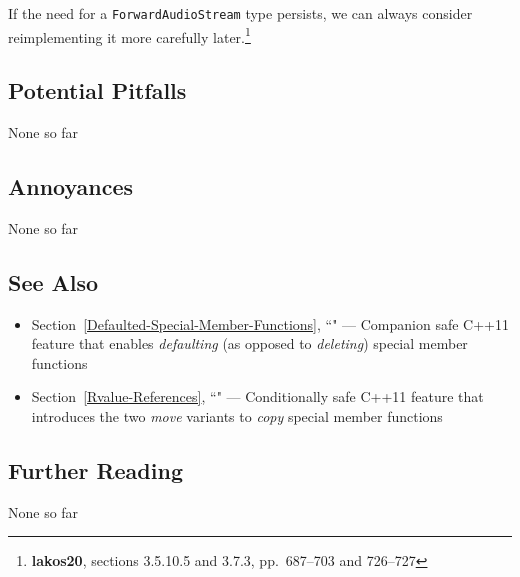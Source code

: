 \noindent If the need for a \texttt{ForwardAudioStream} type persists, we can always
consider reimplementing it more carefully later.{\cprotect\footnote{\textbf{{lakos20}}, sections 3.5.10.5 and 3.7.3, pp.~687--703 and 726--727}}

\subsection[Potential Pitfalls]{Potential Pitfalls}\label{potential-pitfalls}

None so far

\subsection[Annoyances]{Annoyances}\label{annoyances}

None so far

\subsection[See Also]{See Also}\label{see-also}

\begin{itemize}
\item{Section~\ref{Defaulted-Special-Member-Functions}, ``" — Companion safe C++11 feature that enables \emph{defaulting} (as opposed to \emph{deleting}) special member functions}
\item{Section~\ref{Rvalue-References}, ``" — Conditionally safe C++11 feature that introduces the two \emph{move} variants to \emph{copy} special member functions}
\end{itemize}

\subsection[Further Reading]{Further Reading}\label{further-reading}

None so far


